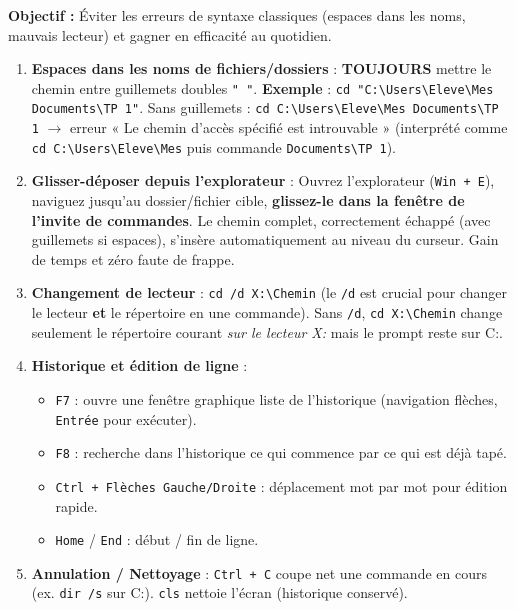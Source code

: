 \documentclass[11pt]{article}
\begin{document}
\begin{methode}
\textbf{Objectif :} Éviter les erreurs de syntaxe classiques (espaces dans les noms, mauvais lecteur) et gagner en efficacité au quotidien.

\begin{enumerate}
    \item \textbf{Espaces dans les noms de fichiers/dossiers} : \textbf{TOUJOURS} mettre le chemin entre guillemets doubles \texttt{" "}.
    \textbf{Exemple} : \texttt{cd "C:\textbackslash Users\textbackslash Eleve\textbackslash Mes Documents\textbackslash TP 1"}.
    Sans guillemets : \texttt{cd C:\textbackslash Users\textbackslash Eleve\textbackslash Mes Documents\textbackslash TP 1} $\to$ erreur « Le chemin d'accès spécifié est introuvable » (interprété comme \texttt{cd C:\textbackslash Users\textbackslash Eleve\textbackslash Mes} puis commande \texttt{Documents\textbackslash TP 1}).
    \item \textbf{Glisser-déposer depuis l'explorateur} : Ouvrez l'explorateur (\texttt{Win + E}), naviguez jusqu'au dossier/fichier cible, \textbf{glissez-le dans la fenêtre de l'invite de commandes}. Le chemin complet, correctement échappé (avec guillemets si espaces), s'insère automatiquement au niveau du curseur. Gain de temps et zéro faute de frappe.
    \item \textbf{Changement de lecteur} : \texttt{cd /d X:\textbackslash Chemin} (le \texttt{/d} est crucial pour changer le lecteur \textbf{et} le répertoire en une commande). Sans \texttt{/d}, \texttt{cd X:\textbackslash Chemin} change seulement le répertoire courant \emph{sur le lecteur X:} mais le prompt reste sur C:.
    \item \textbf{Historique et édition de ligne} :
    \begin{itemize}
        \item \texttt{F7} : ouvre une fenêtre graphique liste de l'historique (navigation flèches, \texttt{Entrée} pour exécuter).
        \item \texttt{F8} : recherche dans l'historique ce qui commence par ce qui est déjà tapé.
        \item \texttt{Ctrl + Flèches Gauche/Droite} : déplacement mot par mot pour édition rapide.
        \item \texttt{Home} / \texttt{End} : début / fin de ligne.
    \end{itemize}
    \item \textbf{Annulation / Nettoyage} : \texttt{Ctrl + C} coupe net une commande en cours (ex. \texttt{dir /s} sur C:). \texttt{cls} nettoie l'écran (historique conservé).
\end{enumerate}
\end{methode}
\end{document}
